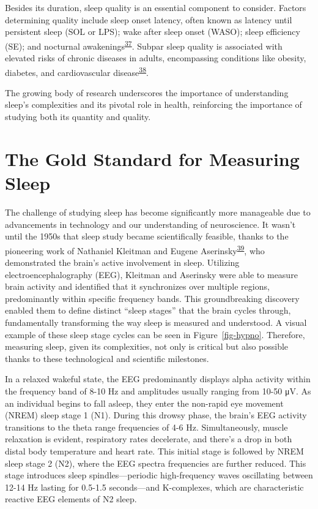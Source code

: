 \documentclass[
  10pt,
]{scrbook}
\begin{document}
Besides its duration, sleep quality is an essential component to
consider. Factors determining quality include sleep onset latency, often
known as latency until persistent sleep (SOL or LPS); wake after sleep
onset (WASO); sleep efficiency (SE); and nocturnal
awakenings\textsuperscript{\protect\hyperlink{ref-buysse_2014}{37}}.
Subpar sleep quality is associated with elevated risks of chronic
diseases in adults, encompassing conditions like obesity, diabetes, and
cardiovascular
disease\textsuperscript{\protect\hyperlink{ref-basnet_2016}{38}}.

The growing body of research underscores the importance of understanding
sleep's complexities and its pivotal role in health, reinforcing the
importance of studying both its quantity and quality.

\hypertarget{the-gold-standard-for-measuring-sleep}{%
\section{The Gold Standard for Measuring
Sleep}\label{the-gold-standard-for-measuring-sleep}}

The challenge of studying sleep has become significantly more manageable
due to advancements in technology and our understanding of neuroscience.
It wasn't until the 1950s that sleep study became scientifically
feasible, thanks to the pioneering work of Nathaniel Kleitman and Eugene
Aserinsky\textsuperscript{\protect\hyperlink{ref-aserinsky_1953}{39}},
who demonstrated the brain's active involvement in sleep. Utilizing
electroencephalography (EEG), Kleitman and Aserinsky were able to
measure brain activity and identified that it synchronizes over multiple
regions, predominantly within specific frequency bands. This
groundbreaking discovery enabled them to define distinct ``sleep
stages'' that the brain cycles through, fundamentally transforming the
way sleep is measured and understood. A visual example of these sleep
stage cycles can be seen in Figure~\ref{fig-hypno}. Therefore, measuring
sleep, given its complexities, not only is critical but also possible
thanks to these technological and scientific milestones.

In a relaxed wakeful state, the EEG predominantly displays alpha
activity within the frequency band of 8-10 Hz and amplitudes usually
ranging from 10-50 \si{\micro\volt}. As an individual begins to fall
asleep, they enter the non-rapid eye movement (NREM) sleep stage 1 (N1).
During this drowsy phase, the brain's EEG activity transitions to the
theta range frequencies of 4-6 Hz. Simultaneously, muscle relaxation is
evident, respiratory rates decelerate, and there's a drop in both distal
body temperature and heart rate. This initial stage is followed by NREM
sleep stage 2 (N2), where the EEG spectra frequencies are further
reduced. This stage introduces sleep spindles---periodic high-frequency
waves oscillating between 12-14 Hz lasting for 0.5-1.5 seconds---and
K-complexes, which are characteristic reactive EEG elements of N2 sleep.
\end{document}
